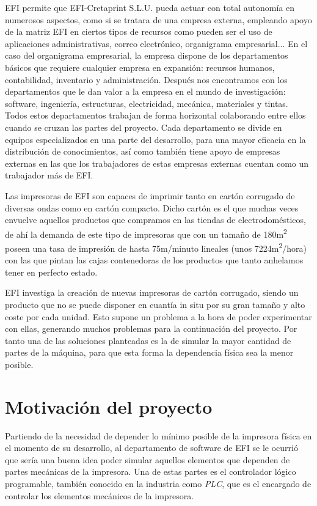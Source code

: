 \documentclass[pdftex,11pt,a4paper]{book}
\begin{document}
EFI permite que EFI-Cretaprint S.L.U. pueda actuar con total autonomía en numerosos aspectos, como si se tratara de una empresa externa, empleando apoyo de la matriz EFI en ciertos tipos de recursos como pueden ser el uso de aplicaciones administrativas, correo electrónico, organigrama empresarial...  En el caso del organigrama empresarial, la empresa dispone de los departamentos básicos que requiere cualquier empresa en expansión: recursos humanos, contabilidad, inventario y administración. Después nos encontramos con los departamentos que le dan valor a la empresa en el mundo de investigación: software, ingeniería, estructuras, electricidad, mecánica, materiales y tintas. Todos estos departamentos trabajan de forma horizontal colaborando entre ellos cuando se cruzan las partes del proyecto. Cada departamento se divide en equipos especializados en una parte del desarrollo, para una mayor eficacia en la distribución de conocimientos, así como también tiene apoyo de empresas externas en las que los trabajadores de estas empresas externas cuentan como un trabajador más de EFI.

Las impresoras de EFI son capaces de imprimir tanto en cartón corrugado de diversas ondas como en cartón compacto. Dicho cartón es el que muchas veces envuelve aquellos productos que compramos en las tiendas de electrodomésticos, de ahí la demanda de este tipo de impresoras que con un tamaño de 180m\textsuperscript{2} poseen una tasa de impresión de hasta 75m/minuto lineales (unos 7224m\textsuperscript{2}/hora) con las que pintan las cajas contenedoras de los productos que tanto anhelamos tener en perfecto estado.

EFI investiga la creación de nuevas impresoras de cartón corrugado, siendo un producto que no se puede disponer en cuantía in situ por su gran tamaño y alto coste por cada unidad. Esto supone un problema a la hora de poder experimentar con ellas, generando muchos problemas para la continuación del proyecto. Por tanto una de las soluciones planteadas es la de simular la mayor cantidad de partes de la máquina, para que esta forma la dependencia física sea la menor posible.

\section{Motivación del proyecto}

Partiendo de la necesidad de depender lo mínimo posible de la impresora física en el momento de su desarrollo, al departamento de software de EFI se le ocurrió que sería una buena idea poder simular aquellos elementos que dependen de partes mecánicas de la impresora. Una de estas partes es el controlador lógico programable, también conocido en la industria como \emph{PLC}, que es el encargado de controlar los elementos mecánicos de la impresora.
\end{document}
